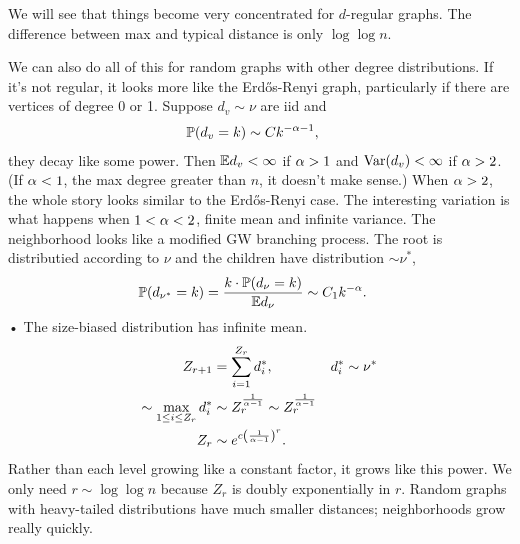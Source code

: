 
We will see that things become very concentrated for $d$-regular graphs. The difference between max and typical distance is only $\log\log n$.

We can also do all of this for random graphs with other degree distributions. If it's not regular, it looks more like the Erd\H os-Renyi graph, particularly if there are vertices of degree 0 or 1. Suppose $d_v\sim \nu$ are iid and 
\begin{align}
\mathbb{P}(d_v = k) &\sim C k^{-\alpha-1},
\end{align}
they decay like some power. Then $\mathbb{E} d_v<\infty$ if $\alpha>1$ and $\operatorname{Var}(d_v)<\infty$ if $\alpha>2$. (If $\alpha<1$, the max degree greater than $n$, it doesn't make sense.)
When $\alpha>2$, the whole story looks similar to the Erd\H os-Renyi case. The interesting variation is what happens when $1<\alpha<2$, finite mean and infinite variance.
The neighborhood looks like a modified GW branching process. The root is distributied according to $\nu$ and the children have distribution $\sim \nu^*$, 
\begin{align}
\mathbb{P}(d_{\nu^*} = k) &=\frac{k\cdot \mathbb{P}(d_\nu = k)}{\mathbb{E} d_\nu} \sim C_1 k^{-\alpha}.
\end{align}•
The size-biased distribution has infinite mean.
\begin{align}
Z_{r+1} &= \sum_{i=1}^{Z_r} d_i^*,& d_i^*&\sim \nu^*\\
\sim \max_{1\le i\le Z_r} d_i^* &\sim Z_r^{\frac{1}{\alpha-1}}\sim Z_r^{\frac{1}{\alpha-1}}\\
Z_r &\sim e^{c\left( {\frac{1}{\alpha-1}} \right)^r}.
\end{align}
Rather than each level growing like a constant factor, it grows like this power. %
We only need $r\sim \log \log n$ because $Z_r$ is doubly exponentially in $r$. Random graphs with heavy-tailed distributions have much smaller distances; neighborhoods grow really quickly. %